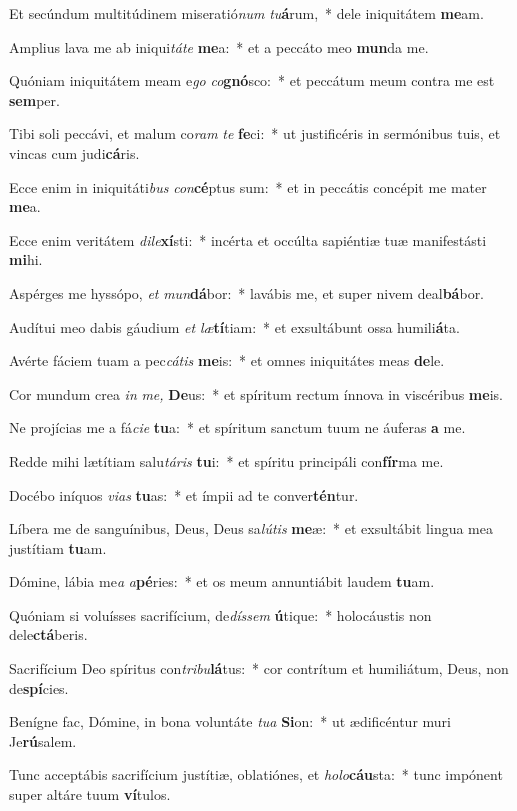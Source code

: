 \item Et secúndum multitúdinem miseratió\textit{num} \textit{tu}\textbf{á}rum,~* dele iniquitátem \textbf{me}am.
\item Amplius lava me ab iniqui\tinyhspace\textit{táte} \textbf{me}a:~* et a peccáto meo \textbf{mun}da me.
\item Quóniam iniquitátem meam e\tinyhspace\textit{go} \textit{co}\textbf{gnó}sco:~* et peccátum meum contra me est \textbf{sem}per.
\item Tibi soli peccávi, et malum co\textit{ram} \textit{te} \textbf{fe}ci:~* ut justificéris in sermónibus tuis, et vincas cum judi\textbf{cá}ris.
\item Ecce enim in iniquitáti\textit{bus} \textit{con}\textbf{cé}ptus sum:~* et in peccátis concépit me mater \textbf{me}a.
\item Ecce enim veritátem \textit{dile}\textbf{xí}sti:~* incérta et occúlta sapiéntiæ tuæ manifestásti \textbf{mi}hi.
\item Aspérges me hyssópo, \textit{et} \textit{mun}\textbf{dá}bor:~* lavábis me, et super nivem deal\textbf{bá}bor.
\item Audítui meo dabis gáudium \textit{et} \textit{læ}\textbf{tí}tiam:~* et exsultábunt ossa humili\textbf{á}ta.
\item Avérte fáciem tuam a pec\tinyhspace\textit{cátis} \textbf{me}is:~* et omnes iniquitátes meas \textbf{de}le.
\item Cor mundum crea \textit{in} \textit{me,} \textbf{De}us:~* et spíritum rectum ínnova in viscéribus \textbf{me}is.
\item Ne projícias me a fá\tinyhspace\textit{cie} \textbf{tu}a:~* et spíritum sanctum tuum ne áuferas \textbf{a} me.
\item Redde mihi lætítiam salu\spurhspace\textit{táris} \textbf{tu}i:~* et spíritu principáli con\textbf{fír}ma me.
\item Docébo iníquos \textit{vias} \textbf{tu}as:~* et ímpii ad te conver\textbf{tén}tur.
\item Líbera me de sanguínibus, Deus, Deus sa\spurhspace\textit{lútis} \textbf{me}æ:~* et exsultábit lingua mea justítiam \textbf{tu}am.
\item Dómine, lábia me\spurhspace\textit{a} \textit{a}\textbf{pé}ries:~* et os meum annuntiábit laudem \textbf{tu}am.
\item Quóniam si voluísses sacrifícium, de\tinyhspace\textit{díssem} \textbf{ú}tique:~* holocáustis non dele\textbf{ctá}beris.
\item Sacrifícium Deo spíritus con\textit{tribu}\textbf{lá}tus:~* cor contrítum et humiliátum, Deus, non de\textbf{spí}cies.
\item Benígne fac, Dómine, in bona voluntáte \textit{tua} \textbf{Si}on:~* ut ædificéntur muri Je\textbf{rú}salem.
\item Tunc acceptábis sacrifícium justítiæ, oblatiónes, et \textit{holo}\textbf{cáu}sta:~* tunc impónent super altáre tuum \textbf{ví}tulos.
